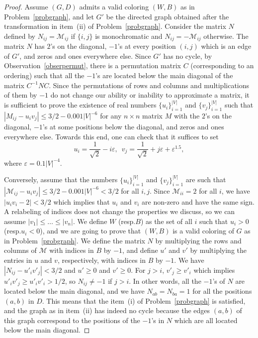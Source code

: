 \documentclass[a4paper,11pt]{article}
\numberwithin{equation}{section}
\begin{document}
\begin{proof}
Assume $(G,D)$ admits a valid coloring $(W,B)$ as in Problem~\ref{probgraph}, 
and let $G'$ be the directed graph obtained after the transformation in item~(ii) of Problem~\ref{probgraph}. 
Consider the matrix $N$ defined by $N_{ij}=\mathcal{M}_{ij}$ if $\{i,j\}$ is monochromatic and $N_{ij}=-\mathcal{M}_{ij}$ otherwise. 
The matrix $N$ has $2$'s on the diagonal, $-1$'s at every position $(i,j)$ which is an edge of $G'$, and zeros and ones everywhere else. 
Since $G'$ has no cycle, by Observation~\ref{obserpermut}, there is a permutation matrix $C$ (corresponding to an ordering) such that all the $-1$'s are located below the main diagonal of the matrix $C^{-1} N C$. Since the permutations of rows and columns and multiplications of them by $-1$ do not change our ability or inability to approximate a matrix, it is sufficient to prove the existence of real numbers $\{u_i\}_{i=1}^{|V|}$ and $\{v_j\}_{i=1}^{|V|}$ such that $|M_{ij}-u_iv_j| \leq 3/2-0.001 |V|^{-6}$ 
for any $n\times n$ matrix $M$ with the $2$'s on the diagonal, $-1$'s at some positions below the diagonal, and zeros and ones everywhere else. Towards this end, one can check that it suffices to set 
$$
u_i=\frac{1}{\sqrt{2}}-i\varepsilon,\,\,\,
v_j=\frac{1}{\sqrt{2}}+j\varepsilon+\varepsilon^{1.5},$$
where $\varepsilon=0.1 |V|^{-4}$. 

Conversely, assume that the numbers $\{u_i\}_{i=1}^{|V|}$ and $\{v_j\}_{i=1}^{|V|}$  are such that 
$|\mathcal{M}_{ij}-u_iv_j| \leq 3/2-0.001 |V|^{-6} < 3/2$ for all $i,j$.  
Since $\mathcal{M}_{ii}=2$ for all $i$, we have $|u_iv_i-2|<3/2$ 
which implies that $u_i$ and $v_i$ are non-zero and have the same sign. A relabeling of indices does not change the properties we discuss, so we can assume $|v_1|\leq \ldots\leq |v_n|$. We define $W$ (resp.\@ $B$) as the set of all $i$ such that $u_i>0$ (resp.\@ $u_i<0$), and we are going to prove that $(W,B)$ is a valid coloring of $G$ as in Problem~\ref{probgraph}. 
We define the matrix $N$ by multiplying the rows and columns of $\mathcal{M}$ with indices in $B$ by $-1$, and define $u'$ and $v'$ by multiplying the entries in $u$ and $v$, respectively, with indices in $B$ by $-1$. 
We have $\left|N_{ij}-u'_iv'_j\right|<3/2$ and $u' \geq 0$ and $v' \geq 0$. 
For  $j>i$, $v'_j\geq v'_i$ which implies $u'_iv'_j \geq u'_i v'_i > 1/2$, so $N_{ij}\neq-1$ if $j>i$. In other words, all the $-1$'s of $N$ are located below the main diagonal, and we have $N_{ab}=N_{ba}=1$ for all the positions $(a,b)$ in $D$. This means that the item~(i) of Problem~\ref{probgraph} is satisfied, and the graph as in item~(ii) has indeed no cycle because the edges $(a,b)$ of this graph correspond to the positions of the $-1$'s in $N$ which are all located below the main diagonal. 
\end{proof} 
\end{document}
